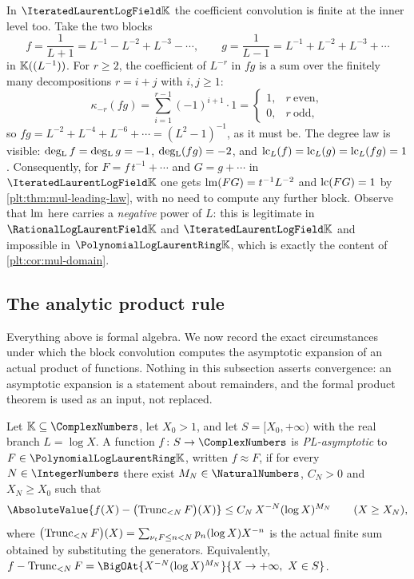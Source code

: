 \begin{example}
\label{plt:ex:mul-worked-iterated}
In $\PLit$ the coefficient convolution is finite at the inner level too.
Take the two blocks
\[
 f=\frac1{L+1}=L^{-1}-L^{-2}+L^{-3}-\cdots,
 \qquad
 g=\frac1{L-1}=L^{-1}+L^{-2}+L^{-3}+\cdots
\]
in $\K((L^{-1}))$.  For $r\ge2$, the coefficient of $L^{-r}$ in $fg$ is a sum
over the finitely many decompositions $r=i+j$ with $i,j\ge1$:
\[
 \kappa_{-r}(fg)=\sum_{i=1}^{r-1}(-1)^{i+1}\cdot1
 =\begin{cases}1,&r\ \text{even},\\0,&r\ \text{odd},\end{cases}
\]
so $fg=L^{-2}+L^{-4}+L^{-6}+\cdots=(L^2-1)^{-1}$, as it must be.  The
degree law is visible: $\degL f=\degL g=-1$, $\degL(fg)=-2$, and
$\lc_L(f)=\lc_L(g)=\lc_L(fg)=1$.  Consequently, for
$F=f\,t^{-1}+\cdots$ and $G=g+\cdots$ in $\PLit$ one gets
$\lm(FG)=t^{-1}L^{-2}$ and $\lc(FG)=1$ by
\cref{plt:thm:mul-leading-law}, with no need to compute any further block.
Observe that $\lm$ here carries a \emph{negative} power of $L$: this is
legitimate in $\PLrat$ and $\PLit$ and impossible in $\PLlau$, which is
exactly the content of \cref{plt:cor:mul-domain}.
\end{example}

\subsection{The analytic product rule}
\label{plt:sec:mul-analytic}

Everything above is formal algebra.  We now record the exact circumstances
under which the block convolution computes the asymptotic expansion of an
actual product of functions.  Nothing in this subsection asserts
convergence: an asymptotic expansion is a statement about remainders, and the
formal product theorem is used as an input, not replaced.

\begin{definition}
\label{plt:def:mul-asymptotic}
Let $\K\subseteq\ComplexNumbers$, let $X_0>1$, and let $S=[X_0,+\infty)$ with
the real branch $L=\log X$.  A function $f\colon S\to\ComplexNumbers$ is
\emph{PL-asymptotic} to $F\in\PLlau$, written $f\approx F$, if for every
$N\in\IntegerNumbers$ there exist $M_N\in\NaturalNumbers$, $C_N>0$ and
$X_N\ge X_0$ such that
\begin{equation}\label{plt:eq:mul-asymptotic}
 \AbsoluteValue{f(X)-\bigl(\Trunc{F}{N}\bigr)(X)}
 \le C_N\,X^{-N}(\log X)^{M_N}
 \qquad(X\ge X_N),
\end{equation}
where $\bigl(\Trunc{F}{N}\bigr)(X)=\sum_{\ordt F\le n<N}p_n(\log X)X^{-n}$ is
the actual finite sum obtained by substituting the generators.  Equivalently,
$f-\Trunc{F}{N}=\BigOAt{X^{-N}(\log X)^{M_N}}{X\to+\infty,\ X\in S}$.
\end{definition}

